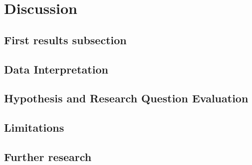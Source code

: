 \section{Discussion}


\subsection{First results subsection}

\subsection{Data Interpretation}


\subsection{Hypothesis and Research Question Evaluation}


\subsection{Limitations}


\subsection{Further research}

